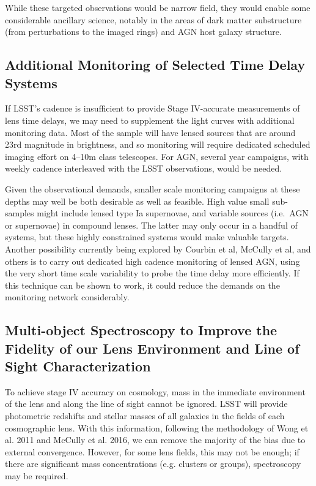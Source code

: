While these targeted observations would be narrow field, they would
enable some considerable ancillary science, notably in the areas of
dark matter substructure (from perturbations to the imaged rings) and
AGN host galaxy structure.



\subsection{Additional Monitoring of Selected Time Delay Systems}

If LSST's cadence is insufficient to provide Stage IV-accurate
measurements of lens time delays, we may need to supplement the light
curves with additional monitoring data. Most of the sample will have
lensed sources that are around 23rd magnitude in brightness, and so
monitoring will require dedicated scheduled imaging effort on 4--10m
class telescopes. For AGN, several year campaigns, with
weekly cadence interleaved with the LSST observations, would be needed.

Given the observational demands, smaller scale monitoring campaigns at
these depths may well be both desirable as well as feasible. High value
small sub-samples might include lensed type Ia supernovae, and variable
sources (i.e.\ AGN or supernovae) in compound lenses. The latter may
only occur in a handful of systems, but these highly constrained systems
would make valuable targets. Another possibility currently being
explored by Courbin et al, McCully et al, and others is to carry out
dedicated high cadence monitoring of lensed AGN, using the very short
time scale variability to probe the time delay more efficiently. If this
technique can be shown to work, it could reduce the demands on the
monitoring network considerably.


\subsection{Multi-object Spectroscopy to Improve
the Fidelity of our Lens Environment and Line of Sight Characterization}

To achieve stage IV accuracy on cosmology, mass in the immediate
environment of the lens and along the line of sight cannot be ignored.
LSST will provide photometric redshifts and stellar masses of all
galaxies in the fields of each cosmographic lens. With this information,
following the methodology of Wong et al. 2011 and McCully et al. 2016,
we can remove the majority of the bias due to external convergence.
However, for some lens fields, this may not be enough; if there are
significant mass concentrations (e.g. clusters or groups), spectroscopy
may be required.

